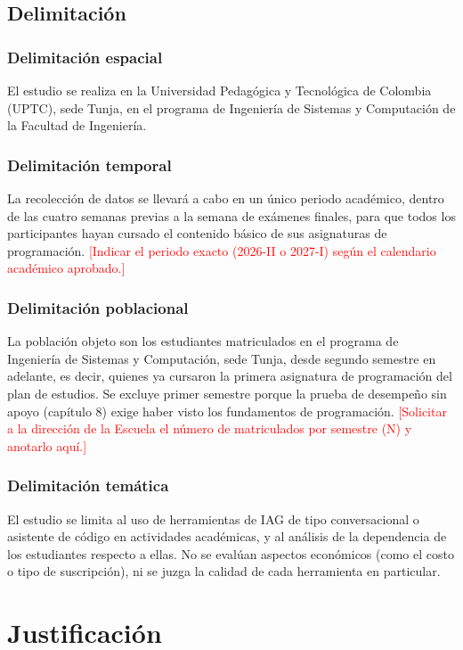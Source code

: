 \documentclass[12pt,letterpaper]{article}
\numberwithin{table}{section}
\numberwithin{figure}{section}
\newcommand{\pendiente}[1]{\textcolor{red}{[#1]}}
\begin{document}
\subsection{Delimitación}

\subsubsection{Delimitación espacial}
El estudio se realiza en la Universidad Pedagógica y Tecnológica de Colombia (UPTC), sede Tunja, en el programa de Ingeniería de Sistemas y Computación de la Facultad de Ingeniería.

\subsubsection{Delimitación temporal}
La recolección de datos se llevará a cabo en un único periodo académico, dentro de las cuatro semanas previas a la semana de exámenes finales, para que todos los participantes hayan cursado el contenido básico de sus asignaturas de programación. \pendiente{Indicar el periodo exacto (2026-II o 2027-I) según el calendario académico aprobado.}

\subsubsection{Delimitación poblacional}
La población objeto son los estudiantes matriculados en el programa de Ingeniería de Sistemas y Computación, sede Tunja, desde segundo semestre en adelante, es decir, quienes ya cursaron la primera asignatura de programación del plan de estudios. Se excluye primer semestre porque la prueba de desempeño sin apoyo (capítulo 8) exige haber visto los fundamentos de programación. \pendiente{Solicitar a la dirección de la Escuela el número de matriculados por semestre (N) y anotarlo aquí.}

\subsubsection{Delimitación temática}
El estudio se limita al uso de herramientas de IAG de tipo conversacional o asistente de código en actividades académicas, y al análisis de la dependencia de los estudiantes respecto a ellas. No se evalúan aspectos económicos (como el costo o tipo de suscripción), ni se juzga la calidad de cada herramienta en particular.

\section{Justificación}
\end{document}
